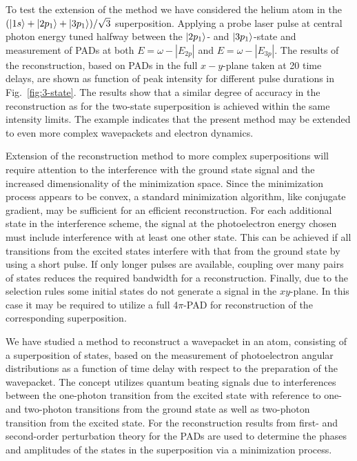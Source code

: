 To test the extension of the method we have considered the helium atom in the $(\ket{1s}+\ket{2p_1}+\ket{3p_1})/\sqrt{3}$ superposition. Applying a probe laser pulse at central photon energy tuned halfway between the $\ket{2p_1}$- and $\ket{3p_1}$-state and measurement of PADs at both $E=\omega-|E_{2p}|$ and $E=\omega-|E_{3p}|$. The results of the reconstruction, based on PADs in the full $x-y$-plane taken at 20 time delays, are shown as function of peak intensity for different pulse durations in Fig.~\ref{fig:3-state}. The results show that a similar degree of accuracy in the reconstruction as for the two-state superposition is achieved within the same intensity limits. The example indicates that the present method may be extended to even more complex wavepackets and electron dynamics. 

Extension of the reconstruction method to more complex superpositions will require attention to the interference with the ground state signal and the increased dimensionality of the minimization space. Since the minimization process appears to be convex, a standard minimization algorithm, like conjugate gradient, may be sufficient for an efficient reconstruction. For each additional state in the interference scheme, the signal at the photoelectron energy chosen must include interference with at least one other state. This can be achieved if all transitions from the excited states interfere with that from the ground state by using a short pulse. If only longer pulses are available, coupling over many pairs of states reduces the required bandwidth for a reconstruction. Finally, due to the selection rules some initial states do not generate a signal in the $xy$-plane. In this case it may be required to utilize a full 4$\pi$-PAD for reconstruction of the corresponding superposition.


We have studied a method to reconstruct a wavepacket in an atom, consisting of a superposition of states, based on the measurement of photoelectron angular distributions as a function of time delay with respect to the preparation of the wavepacket. The concept utilizes quantum beating signals due to interferences between the one-photon transition from the excited state with reference to one- and two-photon transitions from the ground state as well as two-photon transition from the excited state. For the reconstruction results from first- and second-order perturbation theory for the PADs are used to determine the phases and amplitudes of the states in the superposition via a minimization process.

